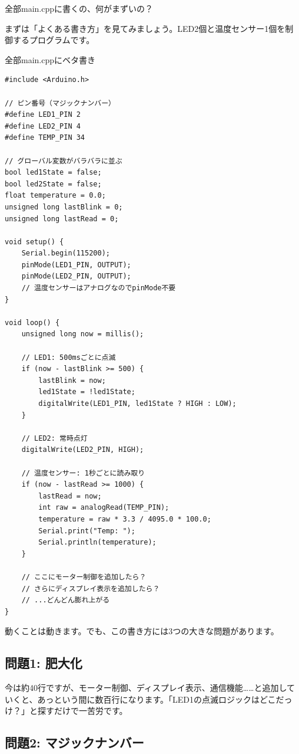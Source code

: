 \begin{qabox}{全部main.cppに書くの、何がまずいの？}

まずは「よくある書き方」を見てみましょう。LED2個と温度センサー1個を制御するプログラムです。

\begin{badexample}{全部main.cppにベタ書き}
\begin{lstlisting}
#include <Arduino.h>

// ピン番号（マジックナンバー）
#define LED1_PIN 2
#define LED2_PIN 4
#define TEMP_PIN 34

// グローバル変数がバラバラに並ぶ
bool led1State = false;
bool led2State = false;
float temperature = 0.0;
unsigned long lastBlink = 0;
unsigned long lastRead = 0;

void setup() {
    Serial.begin(115200);
    pinMode(LED1_PIN, OUTPUT);
    pinMode(LED2_PIN, OUTPUT);
    // 温度センサーはアナログなのでpinMode不要
}

void loop() {
    unsigned long now = millis();

    // LED1: 500msごとに点滅
    if (now - lastBlink >= 500) {
        lastBlink = now;
        led1State = !led1State;
        digitalWrite(LED1_PIN, led1State ? HIGH : LOW);
    }

    // LED2: 常時点灯
    digitalWrite(LED2_PIN, HIGH);

    // 温度センサー: 1秒ごとに読み取り
    if (now - lastRead >= 1000) {
        lastRead = now;
        int raw = analogRead(TEMP_PIN);
        temperature = raw * 3.3 / 4095.0 * 100.0;
        Serial.print("Temp: ");
        Serial.println(temperature);
    }

    // ここにモーター制御を追加したら？
    // さらにディスプレイ表示を追加したら？
    // ...どんどん膨れ上がる
}
\end{lstlisting}
\end{badexample}

動くことは動きます。でも、この書き方には3つの大きな問題があります。

\subsection{問題1: 肥大化}

今は約40行ですが、モーター制御、ディスプレイ表示、通信機能……と追加していくと、あっという間に数百行になります。「LED1の点滅ロジックはどこだっけ？」と探すだけで一苦労です。

\subsection{問題2: マジックナンバー}


\end{qabox}
